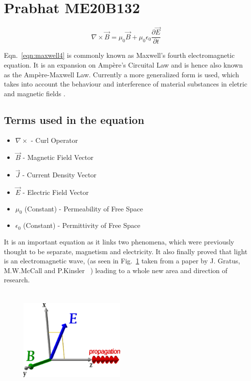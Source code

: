 \section{Prabhat ME20B132}

\begin{equation}
\nabla\times\vec{B} = \mu_0\vec{B} + \mu_0\epsilon_0 \frac{\partial \vec{E}}{\partial t}
\label{eqn:maxwell4}
\end{equation}

Eqn.~\ref{eqn:maxwell4} is commonly known as Maxwell's fourth electromagnetic equation. It is an expansion on Amp\`{e}re's Circuital Law and is hence also known as the Amp\`{e}re-Maxwell Law. Currently a more generalized form is used, which takes into account the behaviour and interference of material substances in eletric and magnetic fields \cite{Gratus2020}.

\subsection{Terms used in the equation}
\begin{itemize}
\item $\nabla\times$ - Curl Operator
\item $\vec{B}$ - Magnetic Field Vector
\item $\vec{J}$ - Current Density Vector
\item $\vec{E}$ - Electric Field Vector
\item $\mu_0$ (Constant) - Permeability of Free Space
\item $\epsilon_0$ (Constant) - Permittivity of Free Space
\end{itemize}

It is an important equation as it links two phenomena, which were previously thought to be separate, magnetism and electricity. It also finally proved that light is an electromagnetic wave, (as seen in Fig.~\ref{fig:light} taken from a paper by J. Gratus, M.W.McCall and P.Kinsler ~\cite{Gratus2020}) leading to a whole new area and direction of research.

\begin{figure}[h]
\centerline{\includegraphics[width=200px,height=200px]{me20b132/me20b132.eps}}
\label{fig:light}
\end{figure} 

